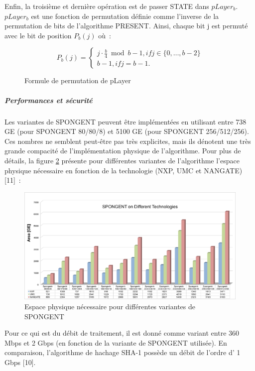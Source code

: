 		Enfin, la troisième et dernière opération est de passer STATE dans $pLayer_{b}$.
		$pLayer_{b}$ est une fonction de permutation définie comme l’inverse de la permutation de bits de l’algorithme PRESENT.
		Ainsi, chaque bit j est permuté avec le bit de position $P_{b}(j)$ où :

		\begin{figure}[htbp]
			\centering
		\begin{equation}
			P_{b}(j) = \begin{cases}
			  j \cdot \frac{b}{4} \bmod b - 1, if j \in \{0, \dots, b - 2\}\\
			  b - 1, if j = b - 1.
			\end{cases}
		  \end{equation}
		  \caption{Formule de permutation de pLayer}
			\label{pLayer}
		\end{figure}

		\subparagraph{Performances et sécurité}

		Les variantes de SPONGENT peuvent être implémentées en utilisant entre 738 GE (pour SPONGENT 80/80/8) et 5100 GE (pour SPONGENT 256/512/256).
		Ces nombres ne semblent peut-être pas très explicites, mais ils dénotent une très grande compacité de l’implémentation physique de l’algorithme.
		Pour plus de détails, la figure \ref{espacePhysique} présente pour différentes variantes de l’algorithme l’espace physique nécessaire en fonction de la technologie (NXP, UMC et NANGATE)[11] :

		\begin{figure}[h]
			\centering
			\includegraphics[width=\textwidth]{imgs/Spongent/espacePhysiqueVariante.png}
			\caption{Espace physique nécessaire pour différentes variantes de SPONGENT}
			\label{espacePhysique}
		\end{figure}

		Pour ce qui est du débit de traitement, il est donné comme variant entre 360 Mbps et 2 Gbps (en fonction de la variante de SPONGENT utilisée).
		En comparaison, l’algorithme de hachage SHA-1 possède un débit de l’ordre d’ 1 Gbps [10].


